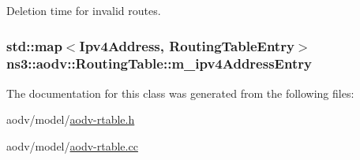 Deletion time for invalid routes. 

\subsubsection[{\texorpdfstring{m\+\_\+ipv4\+Address\+Entry}{m_ipv4AddressEntry}}]{\setlength{\rightskip}{0pt plus 5cm}std\+::map$<${\bf Ipv4\+Address}, {\bf Routing\+Table\+Entry}$>$ ns3\+::aodv\+::\+Routing\+Table\+::m\+\_\+ipv4\+Address\+Entry\hspace{0.3cm}{\ttfamily [private]}}\hypertarget{classns3_1_1aodv_1_1RoutingTable_adb33ba98f0792226c0f1ea7f260f3139}{}\label{classns3_1_1aodv_1_1RoutingTable_adb33ba98f0792226c0f1ea7f260f3139}


The documentation for this class was generated from the following files\+:\begin{DoxyCompactItemize}
\item 
aodv/model/\hyperlink{aodv-rtable_8h}{aodv-\/rtable.\+h}\item 
aodv/model/\hyperlink{aodv-rtable_8cc}{aodv-\/rtable.\+cc}\end{DoxyCompactItemize}
